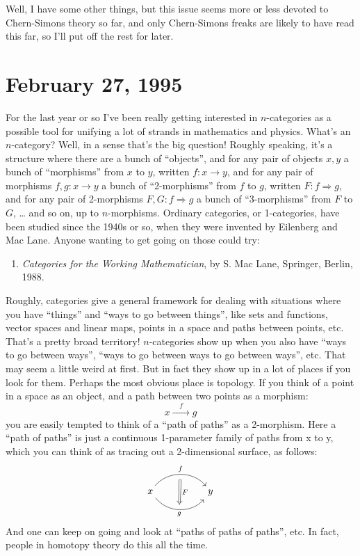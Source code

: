 \documentclass{article}
\def\tightlist{}
\begin{document}
Well, I have some other things, but this issue seems more or less
devoted to Chern-Simons theory so far, and only Chern-Simons freaks are
likely to have read this far, so I'll put off the rest for later.
\hypertarget{week49}{%
\section{February 27, 1995}\label{week49}}

For the last year or so I've been really getting interested in
\(n\)-categories as a possible tool for unifying a lot of strands in
mathematics and physics. What's an \(n\)-category? Well, in a sense
that's the big question! Roughly speaking, it's a structure where there
are a bunch of ``objects'', and for any pair of objects \(x,y\) a bunch
of ``morphisms'' from \(x\) to \(y\), written \(f\colon x \to y\), and
for any pair of morphisms \(f, g\colon x \to y\) a bunch of
``2-morphisms'' from \(f\) to \(g\), written
\(F\colon f \Rightarrow g\), and for any pair of 2-morphisms
\(F, G\colon f \Rightarrow g\) a bunch of ``3-morphisms'' from \(F\) to
\(G\), \ldots{} and so on, up to \(n\)-morphisms. Ordinary categories,
or 1-categories, have been studied since the 1940s or so, when they were
invented by Eilenberg and Mac Lane. Anyone wanting to get going on those
could try:

\begin{enumerate}
\def\labelenumi{\arabic{enumi})}
\tightlist
\item
  \emph{Categories for the Working Mathematician}, by S. Mac Lane,
  Springer, Berlin, 1988.
\end{enumerate}

Roughly, categories give a general framework for dealing with situations
where you have ``things'' and ``ways to go between things'', like sets
and functions, vector spaces and linear maps, points in a space and
paths between points, etc. That's a pretty broad territory!
\(n\)-categories show up when you also have ``ways to go between ways'',
``ways to go between ways to go between ways'', etc. That may seem a
little weird at first. But in fact they show up in a lot of places if
you look for them. Perhaps the most obvious place is topology. If you
think of a point in a space as an object, and a path between two points
as a morphism: \[x\xrightarrow{\quad f\quad}g\] you are easily tempted
to think of a ``path of paths'' as a 2-morphism. Here a ``path of
paths'' is just a continuous 1-parameter family of paths from x to y,
which you can think of as tracing out a 2-dimensional surface, as
follows: \[
  \begin{tikzcd}[sep=huge]
    x
      \rar[bend left=50,"f"{name=U}]
      \rar[bend right=50,swap,"g"{name=D}]
    & y
      \arrow[Rightarrow,shorten=5pt,from=U,to=D,"F"]
  \end{tikzcd}
\] And one can keep on going and look at ``paths of paths of paths'',
etc. In fact, people in homotopy theory do this all the time.
\end{document}
